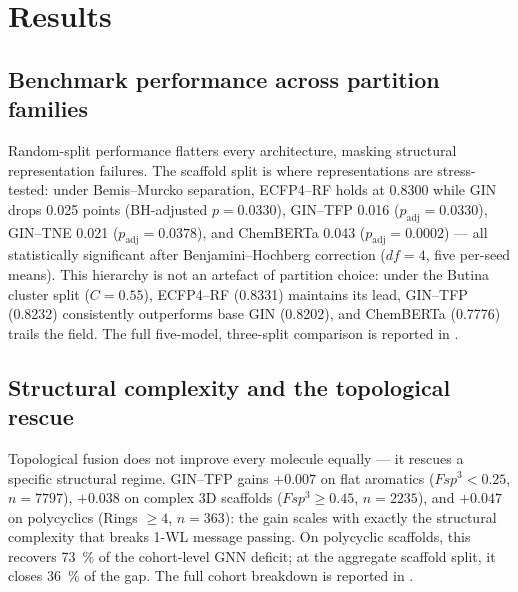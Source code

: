 
\section{Results}

\subsection{Benchmark performance across partition families}

Random-split performance flatters every architecture, masking structural representation failures. The scaffold split is where representations are stress-tested: under Bemis--Murcko separation, ECFP4--RF holds at \num{0.8300} while GIN drops \num{0.025} points (BH-adjusted $p = 0.0330$), GIN--TFP \num{0.016} ($p_{\text{adj}} = 0.0330$), GIN--TNE \num{0.021} ($p_{\text{adj}} = 0.0378$), and ChemBERTa \num{0.043} ($p_{\text{adj}} = 0.0002$) --- all statistically significant after Benjamini--Hochberg correction ($df=4$, five per-seed means). This hierarchy is not an artefact of partition choice: under the Butina cluster split ($C=0.55$), ECFP4--RF (\num{0.8331}) maintains its lead, GIN--TFP (\num{0.8232}) consistently outperforms base GIN (\num{0.8202}), and ChemBERTa (\num{0.7776}) trails the field. The full five-model, three-split comparison is reported in .

\subsection{Structural complexity and the topological rescue}

Topological fusion does not improve every molecule equally --- it rescues a specific structural regime. GIN--TFP gains $+\num{0.007}$ on flat aromatics ($Fsp^3 < 0.25$, $n=\num{7797}$), $+\num{0.038}$ on complex 3D scaffolds ($Fsp^3 \ge 0.45$, $n=\num{2235}$), and $+\num{0.047}$ on polycyclics (Rings $\ge 4$, $n=\num{363}$): the gain scales with exactly the structural complexity that breaks 1-WL message passing. On polycyclic scaffolds, this recovers \qty{73}{\percent} of the cohort-level GNN deficit; at the aggregate scaffold split, it closes \qty{36}{\percent} of the gap. The full cohort breakdown is reported in .

